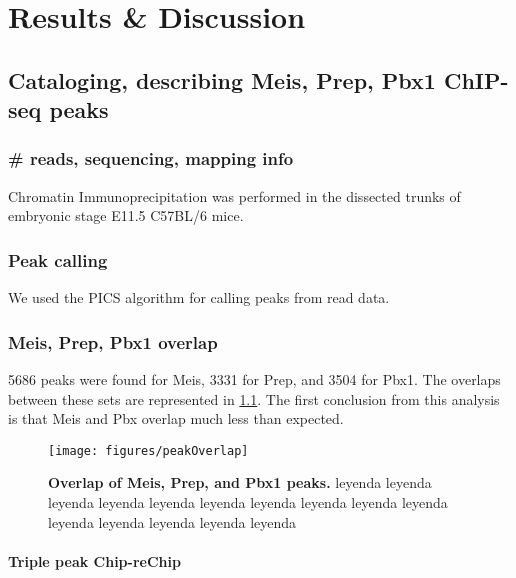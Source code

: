 \chapter{Results \& Discussion}
\label{chp:results}

\section{Cataloging, describing Meis, Prep, Pbx1 ChIP-seq peaks}

\subsection{\# reads, sequencing, mapping info}
Chromatin Immunoprecipitation was performed in the dissected trunks of embryonic stage E11.5 C57BL/6 mice.





\subsection{Peak calling}

We used the PICS algorithm for calling peaks from read data.

\subsection{Meis, Prep, Pbx1 overlap}

5686 peaks were found for Meis, 3331 for Prep, and 3504 for Pbx1. The overlaps between these sets are represented in \ref{fig:peakOverlap}. The first conclusion from this analysis is that Meis and Pbx overlap much less than expected. 


\begin{figure}[]
  
  \centering
  \label{fig:peakOverlap}
  \texttt{[image: figures/peakOverlap]}
  \caption[Overlap of Meis, Prep, and Pbx1 peaks]{\textbf{Overlap of Meis, Prep, and Pbx1 peaks.}  leyenda leyenda leyenda leyenda leyenda leyenda leyenda leyenda leyenda leyenda leyenda leyenda leyenda leyenda leyenda}
\end{figure}






\subsubsection{Triple peak Chip-reChip}

